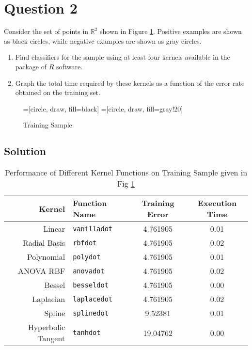 \section*{Question 2}

Consider the set of points in $\mathbb{R}^2$ shown in Figure \ref{fig1}. Positive examples are shown as black circles, while negative examples are shown as gray circles.
\begin{enumerate}[label=(\alph*)]
\item Find classifiers for the sample using at least four kernels available in the package of $R$ software.
\item Graph the total time required by these kernels as a function of the error rate obtained on the training set.
\end{enumerate}

\begin{figure}[H]\centering
{}=[circle, draw, fill=black]
=[circle, draw, fill=gray!20]
\caption{Training Sample}\label{fig1}
\end{figure}

\vfill

\subsection*{Solution}

\begin{table}[H]\centering
\begin{tabular}{r l c c}
Kernel & Function Name & Training Error & Execution Time\\
\hline
Linear & \texttt{vanilladot} & 4.761905 & 0.01\\
Radial Basis & \texttt{rbfdot} & 4.761905 & 0.02\\
Polynomial & \texttt{polydot} & 4.761905 & 0.01\\
ANOVA RBF & \texttt{anovadot} & 4.761905 & 0.02\\
Bessel & \texttt{besseldot} & 4.761905 & 0.00\\
Laplacian & \texttt{laplacedot} & 4.761905 & 0.02\\
Spline & \texttt{splinedot} & 9.52381 & 0.01\\
Hyperbolic Tangent & \texttt{tanhdot} & 19.04762 & 0.00\\
\hline
\end{tabular}
\caption{Performance of Different Kernel Functions on Training Sample given in Fig \ref{fig1}}\label{tab1}
\end{table}

